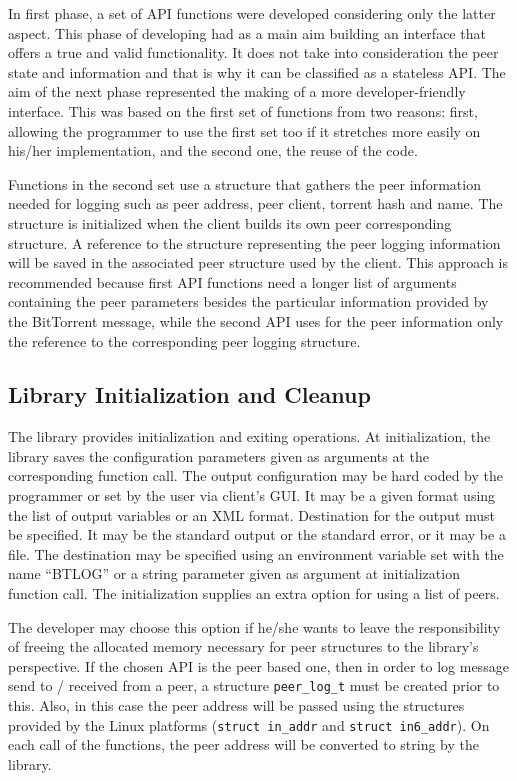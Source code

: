 In first phase, a set of API functions were developed considering only the
latter aspect. This phase of developing had as a main aim building an
interface that offers a true and valid functionality. It does not take into
consideration the peer state and information and that is why it can be
classified as a stateless API. The aim of the next phase represented the
making of a more developer-friendly interface. This was based on the first set
of functions from two reasons: first, allowing the programmer to use the first
set too if it stretches more easily on his/her implementation, and the second
one, the reuse of the code.

Functions in the second set use a structure that gathers the peer information
needed for logging such as peer address, peer client, torrent hash and name.
The structure is initialized when the client builds its own peer corresponding
structure. A reference to the structure representing the peer logging
information will be saved in the associated peer structure used by the client.
This approach is recommended because first API functions need a longer
list of arguments containing the peer parameters besides the particular
information provided by the BitTorrent message, while the second API uses for
the peer information only the reference to the corresponding peer logging
structure.

\subsection{Library Initialization and Cleanup}

The library provides initialization and exiting operations. At initialization,
the library saves the configuration parameters given as arguments at the
corresponding function call. The output configuration may be hard coded by the
programmer or set by the user via client's GUI. It may be a given format using
the list of output variables or an XML format. Destination for the
output must be specified. It may be the standard output or the standard error,
or it may be a file. The destination may be specified using an environment
variable set with the name ``BTLOG'' or a string parameter given as argument at
initialization function call. The initialization supplies an extra option for
using a list of peers.

The developer may choose this option if he/she wants to leave the
responsibility of freeing the allocated memory necessary for peer structures
to the library's perspective. If the chosen API is the peer based one, then in
order to log message send to / received from  a peer, a structure
\texttt{peer\_log\_t} must be created prior to this. Also, in this case the
peer address will be passed using the structures provided by the Linux
platforms (\texttt{struct in\_addr} and \texttt{struct in6\_addr}). On each
call of the functions, the peer address will be converted to string by the
library.

